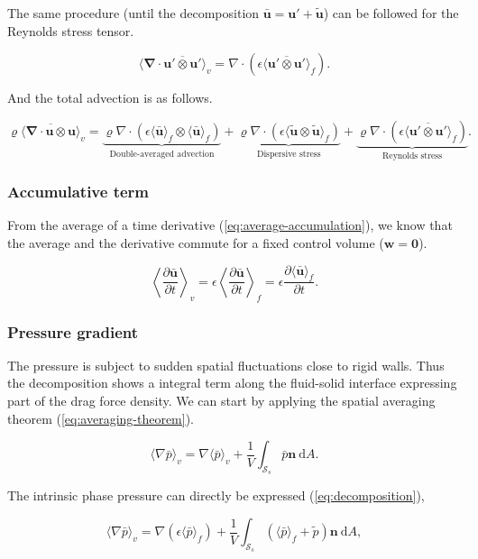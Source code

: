 \documentclass[a4paper,11pt]{article}
\begin{document}
The same procedure (until the decomposition $\bm{\bar u}=\bm u' + \tilde{\bm u}$) can be followed for the Reynolds stress tensor.

$$\boxed{\langle\bm\nabla\cdot \overline{\bm u'\otimes\bm u'}\rangle_v = \nabla\cdot\left(\epsilon\langle\overline{\bm u'\otimes\bm u'}\rangle_f\right).}$$

And the total advection is as follows.

$$\boxed{\varrho\langle\overline{\bm\nabla\cdot \bm u\otimes\bm u}\rangle_v =
\underbrace{\varrho\nabla\cdot\left(\epsilon\langle\bm{\bar u}\rangle_f\otimes\langle\bm{\bar u}\rangle_f\right)}_{\text{Double-averaged advection}}
+ \underbrace{\varrho\nabla\cdot\left(\epsilon\langle \tilde{\bm u}\otimes\tilde{\bm u}\rangle_f\right)}_{\text{Dispersive stress}}
+ \underbrace{\varrho\nabla\cdot\left(\epsilon\langle\overline{\bm u'\otimes\bm u'}\rangle_f\right)}_{\text{Reynolds stress}}.}$$

\subsubsection{Accumulative term}

From the average of a time derivative (\autoref{eq:average-accumulation}), we know that the average and the derivative commute for a fixed control volume ($\bm w = \bm 0$).

$$\left\langle\frac{\partial \bm{\bar u}}{\partial t}\right\rangle_v = \epsilon\left\langle\frac{\partial \bm{\bar u}}{\partial t}\right\rangle_f = \epsilon\frac{\partial\langle\bm{\bar u}\rangle_f}{\partial t}.$$

\subsubsection{Pressure gradient}

The pressure is subject to sudden spatial fluctuations close to rigid walls.
Thus the decomposition shows a integral term along the fluid-solid interface expressing part of the drag force density.
We can start by applying the spatial averaging theorem (\autoref{eq:averaging-theorem}).

$$\langle\nabla\bar p\rangle_v = \nabla\langle\bar p\rangle_v + \frac{1}{V}\int_{\mathcal S_s}\bar p\bm n~\mathrm dA.$$

The intrinsic phase pressure can directly be expressed (\autoref{eq:decomposition}),

$$\langle\nabla\bar p\rangle_v = \nabla \left(\epsilon\langle\bar p\rangle_f\right) + \frac{1}{V}\int_{\mathcal S_s}\left(\langle\bar p\rangle_f+\tilde p\right)\bm n~\mathrm dA,$$
\end{document}
